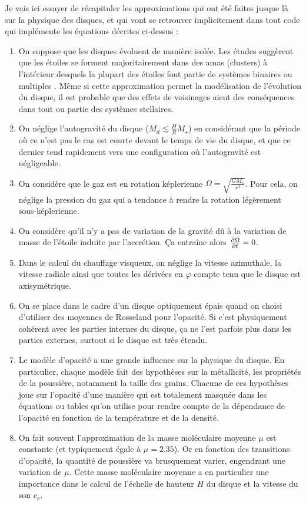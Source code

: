 Je vais ici essayer de récapituler les approximations qui ont été faites jusque là sur la physique des disques, et qui vont se retrouver implicitement dans tout code qui implémente les équations décrites ci-dessus : 
\begin{enumerate}
\item On suppose que les disques évoluent de manière isolée. Les études suggèrent que les étoiles se forment majoritairement dans des amas (clusters) à l'intérieur desquels la plupart des étoiles font partie de systèmes binaires ou multiples \citep{duquennoy1991multiplicity}. Même si cette approximation permet la modélisation de l'évolution du disque, il est probable que des effets de voisinages aient des conséquences dans tout ou partie des systèmes stellaires.
\item On néglige l'autogravité du disque ($M_d \lesssim \frac{H}{R}M_\star$) en considérant que la période où ce n'est pas le cas est courte devant le temps de vie du disque, et que ce dernier tend rapidement vers une configuration où l'autogravité est négligeable.
\item On considère que le gaz est en rotation képlerienne $\Omega=\sqrt{\frac{GM_\star}{r^3}}$. Pour cela, on néglige la pression du gaz qui a tendance à rendre la rotation légèrement sous-képlerienne.
\item On considère qu'il n'y a pas de variation de la gravité dû à la variation de masse de l'étoile induite par l'accrétion. Ça entraîne alors $\pd{\Omega}{t} = 0$.
\item Dans le calcul du chauffage visqueux, on néglige la vitesse azimuthale, la vitesse radiale ainsi que toutes les dérivées en $\varphi$ compte tenu que le disque est axisymétrique.
\item On se place dans le cadre d'un disque optiquement épais quand on choisi d'utiliser des moyennes de Rosseland pour l'opacité. Si c'est physiquement cohérent avec les parties internes du disque, ça ne l'est parfois plus dans les parties externes, surtout si le disque est très étendu.
\item Le modèle d'opacité a une grande influence sur la physique du disque. En particulier, chaque modèle fait des hypothèses sur la métallicité, les propriétés de la poussière, notamment la taille des grains. Chacune de ces hypothèses joue sur l'opacité d'une manière qui est totalement masquée dans les équations ou tables qu'on utilise pour rendre compte de la dépendance de l'opacité en fonction de la température et de la densité.
\item On fait souvent l'approximation de la masse moléculaire moyenne $\mu$ est constante (et typiquement égale à $\mu=2.35$). Or en fonction des transitions d'opacité, la quantité de poussière va brusquement varier, engendrant une variation de $\mu$. Cette masse moléculaire moyenne a en particulier une importance dans le calcul de l'échelle de hauteur $H$ du disque et la vitesse du son $c_s$. 

\end{enumerate}
